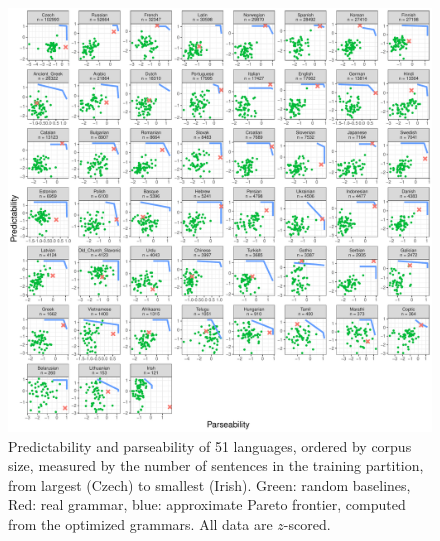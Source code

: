 \documentclass[10pt,twoside,lineno]{article}
\begin{document}




\begin{figure}
\centering
\includegraphics[width=\textwidth]{../results/plane/pareto-plane-perLanguage-WithN.pdf}
	\caption[Predictability and Parseability]{Predictability and parseability of 51 languages, ordered by corpus size, measured by the number of sentences in the training partition, from largest (Czech) to smallest (Irish). Green: random baselines, Red: real grammar, blue: approximate Pareto frontier, computed from the optimized grammars. All data are $z$-scored.}\label{fig:pareto-per-lang}
\end{figure}
\end{document}
